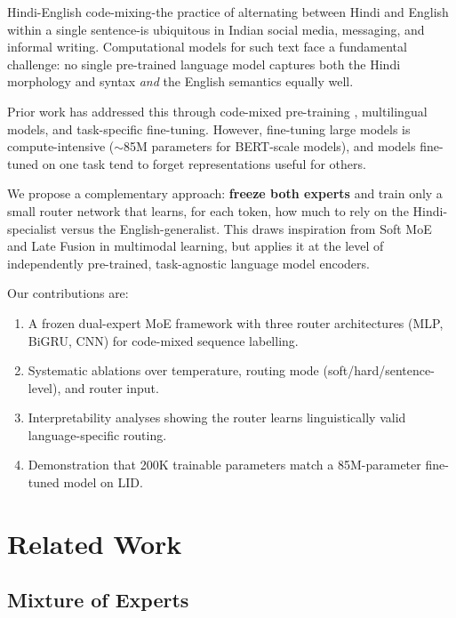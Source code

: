 \documentclass[conference]{IEEEtran}
\begin{document}
Hindi-English code-mixing-the practice of alternating between Hindi and English within a single sentence-is ubiquitous in Indian social media, messaging, and informal writing. Computational models for such text face a fundamental challenge: no single pre-trained language model captures both the Hindi morphology and syntax \emph{and} the English semantics equally well.

Prior work has addressed this through code-mixed pre-training \cite{nayak2022hingbert}, multilingual models, and task-specific fine-tuning. However, fine-tuning large models is compute-intensive ($\sim$85M parameters for BERT-scale models), and models fine-tuned on one task tend to forget representations useful for others.

We propose a complementary approach: \textbf{freeze both experts} and train only a small router network that learns, for each token, how much to rely on the Hindi-specialist versus the English-generalist. This draws inspiration from Soft MoE \cite{puigcerver2024softmoe} and Late Fusion in multimodal learning, but applies it at the level of independently pre-trained, task-agnostic language model encoders.

Our contributions are:
\begin{enumerate}
    \item A frozen dual-expert MoE framework with three router architectures (MLP, BiGRU, CNN) for code-mixed sequence labelling.
    \item Systematic ablations over temperature, routing mode (soft/hard/sentence-level), and router input.
    \item Interpretability analyses showing the router learns linguistically valid language-specific routing.
    \item Demonstration that 200K trainable parameters match a 85M-parameter fine-tuned model on LID.
\end{enumerate}

\section{Related Work}

\subsection{Mixture of Experts}
\end{document}
